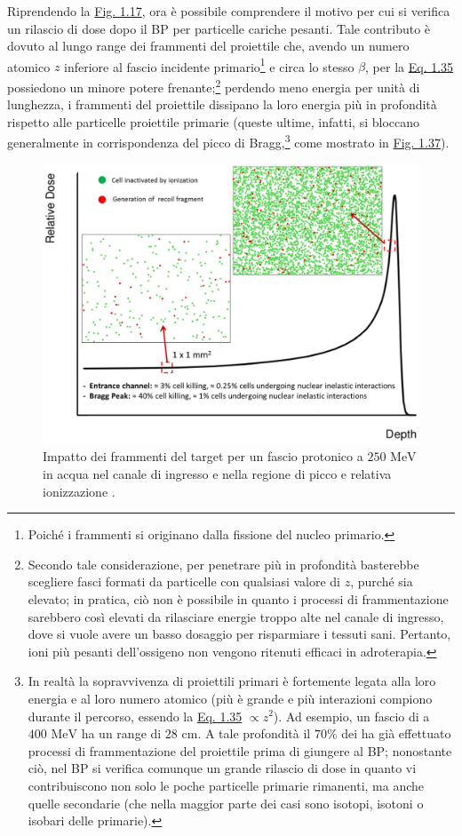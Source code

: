 \documentclass[12pt,a4paper,twoside]{report}
\begin{document}
	Riprendendo la \hyperref[fig:photon]{Fig. 1.17}, ora è possibile comprendere il motivo per cui si verifica un rilascio di dose dopo il BP per particelle cariche pesanti. Tale contributo è dovuto al lungo range dei frammenti del proiettile che, avendo un numero atomico $z$ inferiore al fascio incidente primario\footnote{Poiché i frammenti si originano dalla fissione del nucleo primario.} e circa lo stesso $\beta$, per la \hyperref[eq:bethe_bloch]{Eq. 1.35} possiedono un minore potere frenante;\footnote{Secondo tale considerazione, per penetrare più in profondità basterebbe scegliere fasci formati da particelle con qualsiasi valore di $z$, purché sia elevato; in pratica, ciò non è possibile in quanto i processi di frammentazione sarebbero così elevati da rilasciare energie troppo alte nel canale di ingresso, dove si vuole avere un basso dosaggio per risparmiare i tessuti sani. Pertanto, ioni più pesanti dell'ossigeno non vengono ritenuti efficaci in adroterapia.} perdendo meno energia per unità di lunghezza, i frammenti del proiettile dissipano la loro energia più in profondità rispetto alle particelle proiettile primarie (queste ultime, infatti, si bloccano generalmente in corrispondenza del picco di Bragg,\footnote{In realtà la sopravvivenza di proiettili primari è fortemente legata alla loro energia e al loro numero atomico (più è grande e più interazioni compiono durante il percorso, essendo la \hyperref[eq:bethe_bloch]{Eq. 1.35} $\propto z^2$). Ad esempio, un fascio di  a $400\mbox{ MeV}$ ha un range di $28\mbox{ cm}$. A tale profondità il $70\%$ dei  ha già effettuato processi di frammentazione del proiettile prima di giungere al BP; nonostante ciò, nel BP si verifica comunque un grande rilascio di dose in quanto vi contribuiscono non solo le poche particelle primarie rimanenti, ma anche quelle secondarie (che nella maggior parte dei casi sono isotopi, isotoni o isobari delle primarie).} come mostrato in \hyperref[fig:late_release]{Fig. 1.37}).
	\begin{figure}[H]
		\centering
		\includegraphics[width=0.82\linewidth]{biol_effect_nuclear.png}
		\caption{Impatto dei frammenti del target per un fascio protonico a $250\mbox{ MeV}$ in acqua nel canale di ingresso e nella regione di picco e relativa ionizzazione \cite{cancers7010353}.}
		\label{fig:biol_effect_nuclear}
	\end{figure}
\end{document}

